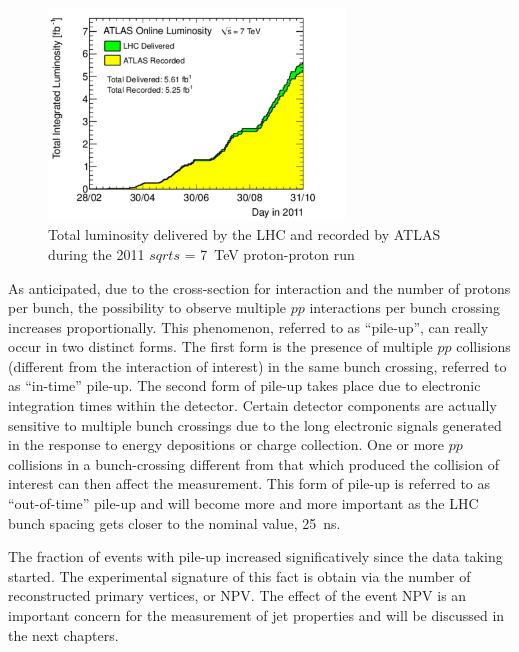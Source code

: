\begin{figure}[htbp]
  \begin{center}
      \includegraphics[width=0.7\textwidth]{Fig2/sumLumiByDay.pdf}
    \caption{Total luminosity delivered by the LHC and recorded by ATLAS during the 2011 $sqrt{s}$ = 7~TeV proton-proton run}
    \label{fig:integratedlumi}
  \end{center}
\end{figure}


As anticipated, due to the cross-section for interaction and the number of protons per bunch, the possibility to observe multiple $pp$ interactions per bunch crossing increases proportionally. This phenomenon, referred to as ``pile-up'', can really occur in two distinct forms. The first form is the presence of multiple $pp$ collisions (different from the interaction of interest) in the same bunch crossing, referred to as ``in-time'' pile-up. The second form of pile-up takes place due to electronic integration times within the detector. Certain detector components are actually sensitive to multiple bunch crossings due to the long electronic signals generated in the response to energy depositions or charge collection. One or more $pp$ collisions in a bunch-crossing different from that which produced the collision of interest can then affect the measurement. This form of pile-up is referred to as ``out-of-time'' pile-up and will become more and more important as the LHC bunch spacing gets closer to the nominal value, 25~ns.

The fraction of events with pile-up increased significatively since the data taking started. The experimental signature of this fact is obtain via the number of reconstructed primary vertices, or NPV. The effect of the event NPV is an important concern for the measurement of jet properties and will be discussed in the next chapters.


%
%

